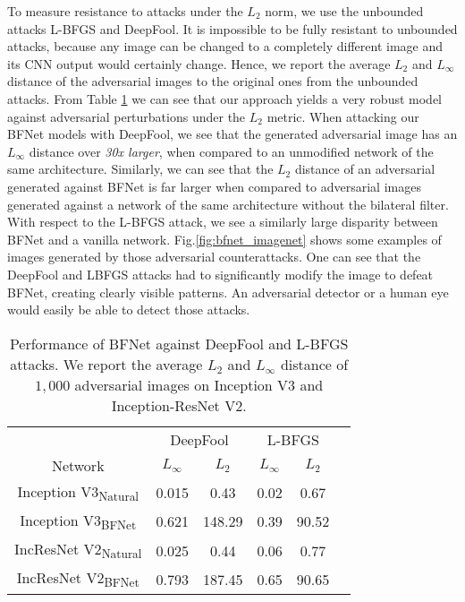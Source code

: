 \documentclass{article} %
\begin{document}
To measure resistance to attacks under the $L_2$ norm, we use the unbounded attacks L-BFGS and DeepFool. It is impossible to be fully resistant to unbounded attacks, because any image can be changed to a completely different image and its CNN output would certainly change. Hence, we report the average $L_2$ and $L_\infty$ distance of the adversarial images to the original ones from the unbounded attacks.
From Table \ref{tab:deepfool_in} we can see that our approach yields a very robust model against adversarial perturbations under the $L_2$ metric. When attacking our BFNet models with DeepFool, we see that the generated adversarial image has an $L_\infty$ distance over \textit{30x larger}, when compared to an unmodified network of the same architecture. Similarly, we can see that the $L_2$ distance of an adversarial generated against BFNet is far larger when compared to adversarial images generated against a network of the same architecture without the bilateral filter. With respect to the L-BFGS attack, we see a similarly large disparity between BFNet and a vanilla network.  Fig.\ref{fig:bfnet_imagenet} shows some examples of images generated by those adversarial counterattacks. One can see that the DeepFool and LBFGS attacks had to significantly modify the image to defeat BFNet, creating clearly visible patterns. An adversarial detector or a human eye would easily be able to detect those attacks.
\begin{table}
\begin{center}
\begin{tabular}{cccccc} \toprule
& \multicolumn{2}{c}{DeepFool} & \multicolumn{2}{c}{L-BFGS} \\
    {Network} & {$L_\infty$} & {$L_2$} & $L_\infty$ & $L_2$  \\ \midrule{Inception V3\textsubscript{Natural}}  & 0.015 & 0.43  & 0.02 & 0.67 \\
    {Inception V3\textsubscript{BFNet}}    & 0.621 & 148.29 & 0.39 & 90.52 \\ \midrule{IncResNet V2\textsubscript{Natural}}  & 0.025 & 0.44 & 0.06 & 0.77  \\
    {IncResNet V2\textsubscript{BFNet}}    & 0.793 & 187.45 & 0.65 & 90.65\\ \bottomrule
\end{tabular}
\end{center}
\vskip -0.1in
\caption{ Performance of BFNet against DeepFool and L-BFGS attacks. We report the average $L_2$ and $L_\infty$ distance of $1,000$ adversarial images on Inception V3 and Inception-ResNet V2.}
\label{tab:deepfool_in}
\vskip -0.2in
\end{table}
\end{document}
